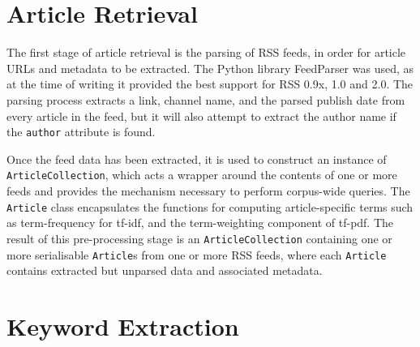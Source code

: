 \section{Article Retrieval}

The first stage of article retrieval is the parsing of RSS feeds, in order for article URLs and metadata to be extracted. The Python library FeedParser was used, as at the time of writing it provided the best support for RSS 0.9x, 1.0 and 2.0. The parsing process extracts a link, channel name, and the parsed publish date from every article in the feed, but it will also attempt to extract the author name if the \texttt{author} attribute is found.

Once the feed data has been extracted, it is used to construct an instance of \texttt{ArticleCollection}, which acts a wrapper around the contents of one or more feeds and provides the mechanism necessary to perform corpus-wide queries. The \texttt{Article} class encapsulates the functions for computing article-specific terms such as term-frequency for tf-idf, and the term-weighting component of tf-pdf. The result of this pre-processing stage is an \texttt{ArticleCollection} containing one or more serialisable \texttt{Article}s from one or more RSS feeds, where each \texttt{Article} contains extracted but unparsed data and associated metadata.

\section{Keyword Extraction}

